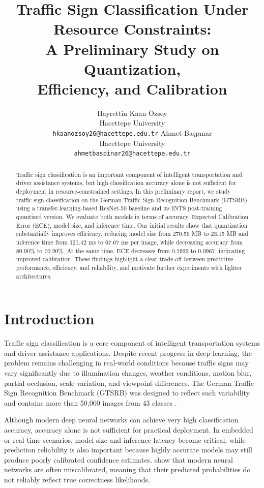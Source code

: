 \documentclass{article} %
\title{Traffic Sign Classification Under Resource Constraints:\\
A Preliminary Study on Quantization, \\ Efficiency, and Calibration}
\author{
\hspace*{-0.25em}Hayrettin Kaan Özsoy \\
Hacettepe University \\
\texttt{hkaanozsoy26@hacettepe.edu.tr}
\And
Ahmet Başpınar \\
Hacettepe University \\
\texttt{ahmetbaspinar26@hacettepe.edu.tr}
}
\begin{document}
\maketitle

\begin{abstract}
Traffic sign classification is an important component of intelligent transportation and driver assistance systems, but high classification accuracy alone is not sufficient for deployment in resource-constrained settings. In this preliminary report, we study traffic sign classification on the German Traffic Sign Recognition Benchmark (GTSRB) using a transfer-learning-based ResNet-50 baseline and its INT8 post-training quantized version. We evaluate both models in terms of accuracy, Expected Calibration Error (ECE), model size, and inference time. Our initial results show that quantization substantially improves efficiency, reducing model size from 270.56 MB to 23.15 MB and inference time from 121.42 ms to 67.67 ms per image, while decreasing accuracy from 80.90\% to 70.20\%. At the same time, ECE decreases from 0.1922 to 0.0967, indicating improved calibration. These findings highlight a clear trade-off between predictive performance, efficiency, and reliability, and motivate further experiments with lighter architectures.
\end{abstract}

\section{Introduction}

Traffic sign classification is a core component of intelligent transportation systems and driver assistance applications. Despite recent progress in deep learning, the problem remains challenging in real-world conditions because traffic signs may vary significantly due to illumination changes, weather conditions, motion blur, partial occlusion, scale variation, and viewpoint differences. The German Traffic Sign Recognition Benchmark (GTSRB) was designed to reflect such variability and contains more than 50,000 images from 43 classes \citep{stallkamp2011gtsrb}.

Although modern deep neural networks can achieve very high classification accuracy, accuracy alone is not sufficient for practical deployment. In embedded or real-time scenarios, model size and inference latency become critical, while prediction reliability is also important because highly accurate models may still produce poorly calibrated confidence estimates. \citet{guo2017calibration} show that modern neural networks are often miscalibrated, meaning that their predicted probabilities do not reliably reflect true correctness likelihoods.
\end{document}
